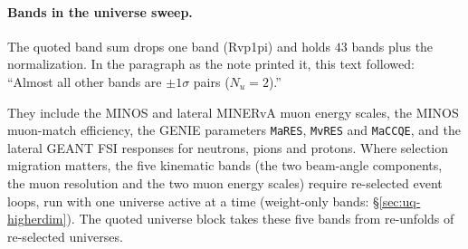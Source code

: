 \paragraph{Bands in the universe sweep.} The quoted band sum drops one band (Rvp1pi) and holds $43$ bands plus the normalization. In the paragraph as the note printed it, this text followed: ``Almost all other bands are $\pm1\sigma$ pairs ($N_{u}=2$).''\par They include the MINOS and lateral MINERvA muon energy scales, the MINOS muon-match efficiency, the GENIE parameters \texttt{MaRES}, \texttt{MvRES} and \texttt{MaCCQE}, and the lateral GEANT FSI responses for neutrons, pions and protons. Where selection migration matters, the five kinematic bands (the two beam-angle components, the muon resolution and the two muon energy scales) require re-selected event loops, run with one universe active at a time (weight-only bands: \S\ref{sec:uq-higherdim}). The quoted universe block takes these five bands from re-unfolds of re-selected universes.

